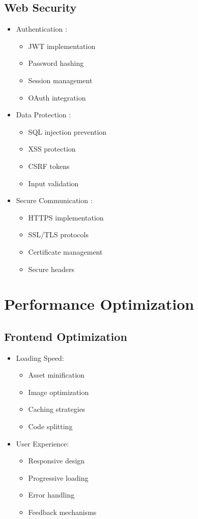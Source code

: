 \subsection{Web Security}
\begin{itemize}
    \item Authentication \cite{websecurity}:
    \begin{itemize}
        \item JWT implementation
        \item Password hashing
        \item Session management
        \item OAuth integration
    \end{itemize}
    \item Data Protection \cite{websecurity}:
    \begin{itemize}
        \item SQL injection prevention
        \item XSS protection
        \item CSRF tokens
        \item Input validation
    \end{itemize}
    \item Secure Communication \cite{websecurity}:
    \begin{itemize}
        \item HTTPS implementation
        \item SSL/TLS protocols
        \item Certificate management
        \item Secure headers
    \end{itemize}
\end{itemize}

\section{Performance Optimization}
\subsection{Frontend Optimization}
\begin{itemize}
    \item Loading Speed:
    \begin{itemize}
        \item Asset minification
        \item Image optimization
        \item Caching strategies
        \item Code splitting
    \end{itemize}
    \item User Experience:
    \begin{itemize}
        \item Responsive design
        \item Progressive loading
        \item Error handling
        \item Feedback mechanisms
    \end{itemize}
\end{itemize}

